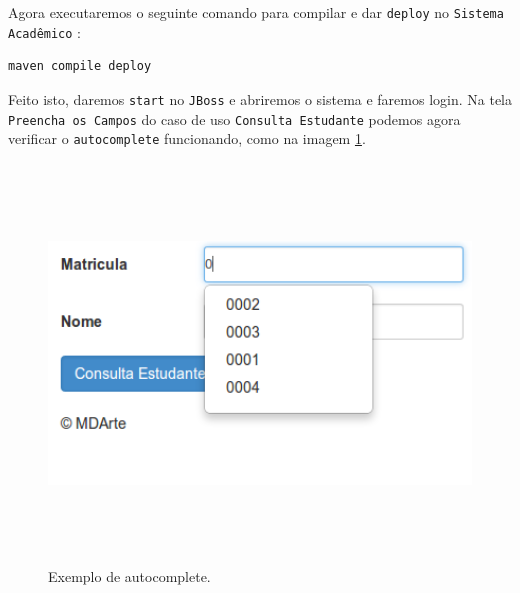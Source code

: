 \begin{framed}

\end{framed}

Agora executaremos o seguinte comando para compilar e dar \texttt{deploy} no
\texttt{Sistema Acadêmico} :
\begin{lstlisting}[language=bash]
maven compile deploy
\end{lstlisting}

Feito isto, daremos \texttt{start} no \texttt{JBoss} e abriremos o sistema e
faremos login. Na tela \texttt{Preencha os Campos} do caso de uso
\texttt{Consulta Estudante} podemos agora verificar o \texttt{autocomplete}
funcionando, como na imagem \ref{exemplo_autocomplete}.
\begin{figure}[H]
	\centering
	\includegraphics[width=350pt,height=300pt]{imgs/tutorial-mdarte-0029.png}
	\caption{Exemplo de autocomplete.}
	\label{exemplo_autocomplete}
\end{figure}